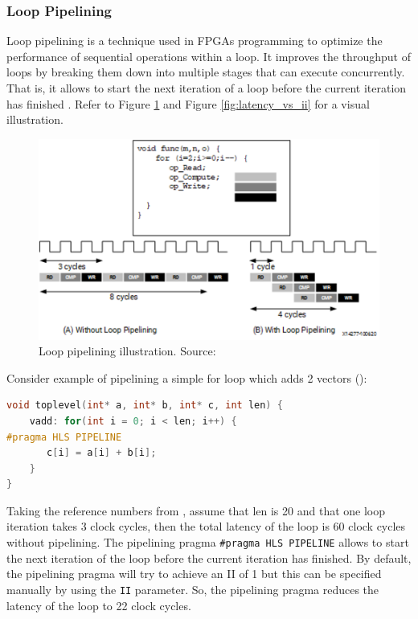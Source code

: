 \documentclass[a4paper, twoside]{report}
\theoremstyle{definition}
\numberwithin{equation}{section}
\begin{document}
\subsubsection{Loop Pipelining} \label{sec:loop_pipelining}

Loop pipelining is a technique used in FPGAs programming to optimize the performance of sequential operations within a loop.
It improves the throughput of loops by breaking them down into multiple stages
that can execute concurrently.
That is, it allows to start the next iteration of a loop before the current
iteration has finished \cite{AMD2023Pipelining}.
Refer to Figure \ref{fig:loop_pipelining} and Figure \ref{fig:latency_vs_ii} for a visual illustration.


\begin{figure}[h!]
    \centering
    \includegraphics[scale=0.7]{loop_pipelining.png}
    \caption{Loop pipelining illustration. Source: \cite{AMD2023Pipelining}}
    \label{fig:loop_pipelining}
\end{figure}


Consider example of pipelining a simple for loop which adds 2 vectors (\cite{AMD2023Pipelining}):
\begin{lstlisting}[language=c++,numbers=none]
void toplevel(int* a, int* b, int* c, int len) {
	vadd: for(int i = 0; i < len; i++) {
#pragma HLS PIPELINE
	   c[i] = a[i] + b[i];
	}
}
\end{lstlisting}

Taking the reference numbers from \cite{AMD2023Pipelining},
assume that len is 20 and that one loop iteration takes 3 clock cycles,
then the total latency of the loop is 60 clock cycles without pipelining.
The pipelining pragma \texttt{\#pragma HLS PIPELINE} allows to start
the next iteration of the loop before the current iteration has finished.
By default, the pipelining pragma will try to achieve an II of 1 but this
can be specified manually by using the \texttt{II} parameter.
So, the pipelining pragma reduces the latency of the loop to 22 clock cycles.
\end{document}
